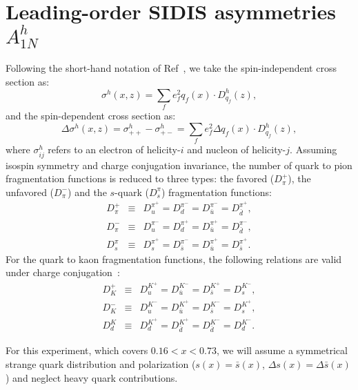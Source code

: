 \section{Leading-order SIDIS asymmetries $A_{1N}^h$}
Following the  short-hand notation of 
Ref~\cite{leader2}, we take the spin-independent cross section as:
\begin{equation}  
 \sigma^{h} (x,z) = \sum_{f} e_f^2 q_f(x) \cdot D_{q_f}^{h}(z),  
\label{eq:fact2}  
\end{equation}  
and the spin-dependent cross section as:
\begin{equation}  
 \Delta \sigma^{h} (x,z) = \sigma^{h}_{++}-\sigma^{h}_{+-}=
 \sum_{f} e_f^2 \Delta q_f(x) \cdot D_{q_f}^{h}(z),  
\label{eq:qfact2}  
\end{equation}  
where $\sigma^{h}_{ij}$ refers to an electron of helicity-$i$ and nucleon of helicity-$j$.
Assuming isospin symmetry and charge conjugation invariance, the number of quark to pion 
 fragmentation functions is   
reduced to three types: the favored ($D_{\pi}^{+}$), the unfavored ($D_{\pi}^{-}$) 
 and the $s$-quark ($D_s^{\pi}$) fragmentation functions:   
\begin{eqnarray}  
 D_{\pi}^{+} & \equiv & D_{u}^{\pi^+} =D_{d}^{\pi^-}=D_{\bar u}^{\pi^-}=D_{\bar d}^{\pi^+}, \nonumber \\ 
 D_{\pi}^{-} & \equiv & D_{u}^{\pi^-} =D_{d}^{\pi^+}=D_{\bar u}^{\pi^+}=D_{\bar d}^{\pi^-}, \nonumber \\
 D_s^{\pi} & \equiv & D_{s}^{\pi^+} =D_{\bar{s}}^{\pi^-}
=D_{\bar u}^{\pi^+}=D_{\bar s}^{\pi^+}.
\label{eq:fragpi}  
\end{eqnarray} 
For the quark to kaon fragmentation functions, the following relations are valid under charge conjugation~\cite{field}:
\begin{eqnarray}  
 D_{K}^{+} & \equiv & D_{u}^{K^+} =D_{\bar{u}}^{K^-}=D_{\bar{s}}^{K^+}=D_{s}^{K^-}, \nonumber \\ 
 D_{K}^{-} & \equiv & D_{u}^{K^-} =D_{\bar{u}}^{K^+}=D_{\bar{s}}^{K^-}=D_{s}^{K^+}, \nonumber \\
 D_d^{K} & \equiv & D_{d}^{K^+} =D_{\bar{d}}^{K^+}=D_{\bar d}^{K^-}=D_{d}^{K^-}.
\label{eq:fragk}  
\end{eqnarray} 

For this experiment, which covers $0.16<x<0.73$,
 we will assume a symmetrical strange quark distribution and polarization
 ($s(x)=\bar{s}(x)$, $\Delta s(x)=\Delta \bar{s}(x)$) and neglect 
 heavy quark contributions.   


